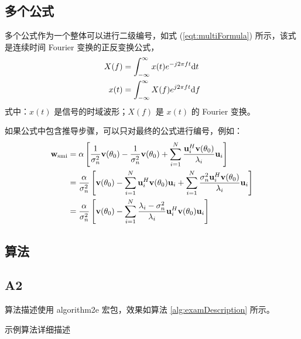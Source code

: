 \subsection{多个公式}%

多个公式作为一个整体可以进行二级编号，如式 (\ref{eqt:multiFormula}) 所示，该式是连续时间 Fourier 变换的正反变换公式，
\begin{subequations}\label{eqt:multiFormula}
	\begin{align}
		X(f) & = \int_{-\infty}^{\infty}x(t)e^{-j2\pi f t}\mathrm{d} t \\
		x(t) & = \int_{-\infty}^{\infty}X(f)e^{j2\pi f t}\mathrm{d} f
	\end{align}
\end{subequations}
式中：$x(t)$ 是信号的时域波形；$X(f)$ 是 $x(t)$ 的 Fourier 变换。

如果公式中包含推导步骤，可以只对最终的公式进行编号，例如：
\begin{align}
	\mathbf{w}_{\mathrm{smi}} & = \alpha \left[\frac{1}{\sigma_n^2}\mathbf{v}(\theta_0) - \frac{1}{\sigma_n^2}\mathbf{v}(\theta_0) + \sum_{i=1}^{N} \frac{\mathbf{u}_i^H\mathbf{v}(\theta_0)}{\lambda_i} \mathbf{u}_i\right] \nonumber                         \\
	                       & = \frac{\alpha}{\sigma_n^2} \left[\mathbf{v}(\theta_0) - \sum_{i=1}^{N}\mathbf{u}_i^H\mathbf{v}(\theta_0)\mathbf{u}_i +  \sum_{i=1}^{N}\frac{\sigma_n^2\mathbf{u}_i^H\mathbf{v}(\theta_0)}{\lambda_i} \mathbf{u}_i \right] \nonumber \\
	                       & = \frac{\alpha}{\sigma_n^2} \left[\mathbf{v}(\theta_0) - \sum_{i=1}^{N} \frac{\lambda_i-\sigma_n^2}{\lambda_i} \mathbf{u}_i^H\mathbf{v}(\theta_0)\mathbf{u}_i \right]
\end{align}

\subsection{算法}

\subsection{A2}
算法描述使用 algorithm2e 宏包，效果如算法 \ref{alg:examDescription} 所示。

\begin{algorithm}[H]
    \caption{示例算法详细描述}
    \label{alg:examDescription}

\end{algorithm}


